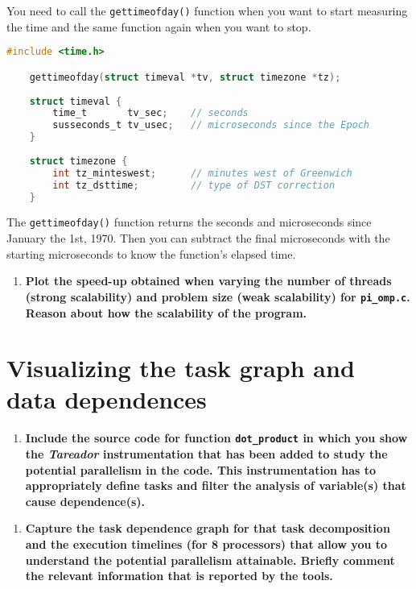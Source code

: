 \documentclass[a4paper]{article}
\begin{document}
You need to call the \texttt{gettimeofday()} function when you want to start measuring the time and the same function again when you want to stop. 

\begin{lstlisting}[language=C]
    #include <time.h>

    gettimeofday(struct timeval *tv, struct timezone *tz);
    
    struct timeval {
        time_t       tv_sec;    // seconds
        susseconds_t tv_usec;   // microseconds since the Epoch
    }
    
    struct timezone {
        int tz_minteswest;      // minutes west of Greenwich
        int tz_dsttime;	        // type of DST correction
    }
\end{lstlisting}

The \texttt{gettimeofday()} function returns the seconds and microseconds since January the 1st, 1970. Then you can subtract the final microseconds with the starting microseconds to know the function's elapsed time. 

\begin{enumerate}[resume]
	\item \textbf{Plot the speed-up obtained when varying the number of threads (strong scalability) and problem size (weak scalability) for \texttt{pi\_omp.c}. Reason about how the scalability of the program.}
\end{enumerate}

\section*{Visualizing the task graph and data dependences}

\begin{enumerate}[resume]
	\item \textbf{Include the source code for function \texttt{dot\_product} in which you show the \textit{Tareador} instrumentation that has been added to study the potential parallelism in the code. This instrumentation has to appropriately define tasks and filter the analysis of variable(s) that cause dependence(s).}
\end{enumerate}

\begin{enumerate}[resume]
	\item \textbf{Capture the task dependence graph for that task decomposition and the execution timelines (for 8 processors) that allow you to understand the potential parallelism attainable. Briefly comment the relevant information that is reported by the tools.}
\end{enumerate}
\end{document}
